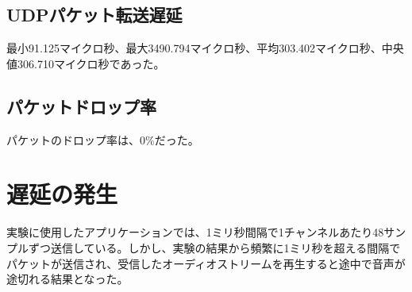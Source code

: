 \subsection{UDPパケット転送遅延}

最小91.125マイクロ秒、最大3490.794マイクロ秒、平均303.402マイクロ秒、中央値306.710マイクロ秒であった。

\subsection{パケットドロップ率}

パケットのドロップ率は、0\%だった。

\section{遅延の発生}
\label{sec:evaluation_latency}

実験に使用したアプリケーションでは、1ミリ秒間隔で1チャンネルあたり48サンプルずつ送信している。しかし、実験の結果から頻繁に1ミリ秒を超える間隔でパケットが送信され、受信したオーディオストリームを再生すると途中で音声が途切れる結果となった。
